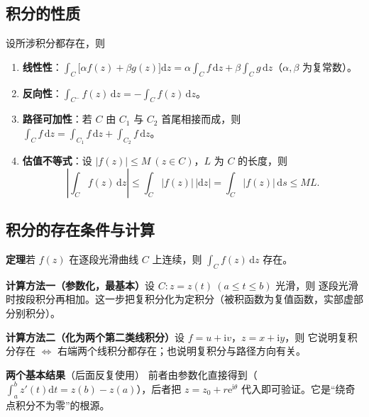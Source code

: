 \subsection{积分的性质}
设所涉积分都存在，则
\begin{enumerate}[leftmargin=2em]
  \item \textbf{线性性}：\(\displaystyle\int_{C}\bigl[\alpha f(z)+\beta g(z)\bigr]\mathrm{d}z=\alpha\int_{C}f\,\mathrm{d}z+\beta\int_{C}g\,\mathrm{d}z\)（\(\alpha,\beta\) 为复常数）。
  \item \textbf{反向性}：\(\displaystyle\int_{C^{-}}f(z)\,\mathrm{d}z=-\int_{C}f(z)\,\mathrm{d}z\)。
  \item \textbf{路径可加性}：若 \(C\) 由 \(C_{1}\) 与 \(C_{2}\) 首尾相接而成，则 \(\displaystyle\int_{C}f\,\mathrm{d}z=\int_{C_{1}}f\,\mathrm{d}z+\int_{C_{2}}f\,\mathrm{d}z\)。
  \item \textbf{估值不等式}：设 \(|f(z)|\leqslant M\ (z\in C)\)，\(L\) 为 \(C\) 的长度，则
  \[
  \left|\int_{C}f(z)\,\mathrm{d}z\right|\leqslant\int_{C}|f(z)|\,|\mathrm{d}z|=\int_{C}|f(z)|\,\mathrm{d}s\leqslant ML .
  \]
\end{enumerate}


\subsection{积分的存在条件与计算}
\textbf{定理}\quad 若 \(f(z)\) 在逐段光滑曲线 \(C\) 上连续，则 \(\displaystyle\int_{C}f(z)\,\mathrm{d}z\) 存在。

\textbf{计算方法一（参数化，最基本）}\quad 设 \(C:z=z(t)\ (a\leqslant t\leqslant b)\) 光滑，则
逐段光滑时按段积分再相加。这一步把复积分化为定积分（被积函数为复值函数，实部虚部分别积分）。

\textbf{计算方法二（化为两个第二类线积分）}\quad 设 \(f=u+\mathrm{i}v\)，\(z=x+\mathrm{i}y\)，则
它说明复积分存在 \(\iff\) 右端两个线积分都存在；也说明复积分与路径方向有关。

\textbf{两个基本结果}（后面反复使用）
前者由参数化直接得到（\(\int_{a}^{b}z'(t)\mathrm{d}t=z(b)-z(a)\)），后者把 \(z=z_{0}+r\mathrm{e}^{\mathrm{i}\theta}\) 代入即可验证。它是“绕奇点积分不为零”的根源。

